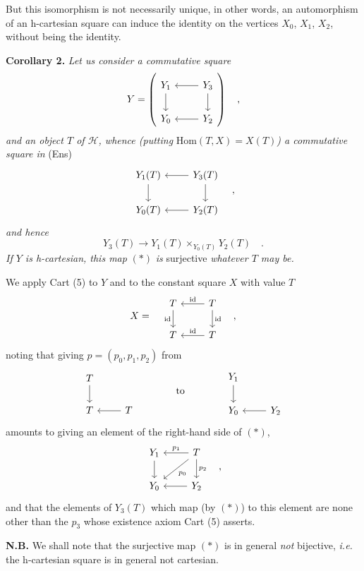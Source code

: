 But this isomorphism is not necessarily unique, in other words, an automorphism of an h-cartesian square can induce the identity on the vertices $X_0$, $X_1$, $X_2$, without being the identity.


\textbf{Corollary 2.} \textit{Let us consider a commutative square}
\[
Y = \left(\begin{tikzcd}
Y_1 \ar[d] & Y_3 \ar[l] \ar[d] \\
Y_0 & Y_2 \ar[l]
\end{tikzcd}\right) \quad ,
\]
\textit{and an object $T$ of $\mathcal{H}$, whence (putting} $\mathrm{Hom}(T,X) = X(T)$\textit{) a commutative square in} (Ens)
\[
\begin{tikzcd}
Y_1(T) \ar[d] & Y_3(T) \ar[l] \ar[d] \\
Y_0(T) & Y_2(T) \ar[l]
\end{tikzcd} \quad ,
\]
\textit{and hence}
\[
Y_3(T) \longrightarrow Y_1(T) \times_{Y_0(T)} Y_2(T) \quad . \tag*{$(*)$}
\]
\textit{If $Y$ is h-cartesian, this map} $(*)$ \textit{is} surjective \textit{whatever $T$ may be.}

We apply Cart (5) to $Y$ and to the constant square $X$ with value $T$
\[
X = \quad
\begin{tikzcd}
T \ar[d, "\mathrm{id}"'] & T \ar[l, "\mathrm{id}"'] \ar[d, "\mathrm{id}"] \\
T & T \ar[l, "\mathrm{id}"']
\end{tikzcd} \quad ,
\]
noting that giving $p = (p_0, p_1, p_2)$ from
\[
\begin{tikzcd}
T \ar[d] & \\
T & T \ar[l]
\end{tikzcd}
\qquad\qquad \text{to} \qquad\qquad
\begin{tikzcd}
Y_1 \ar[d] & \\
Y_0 & Y_2 \ar[l]
\end{tikzcd}
\]
amounts to giving an element of the right-hand side of $(*)$,
\[
\begin{tikzcd}
Y_1 \ar[d] & T \ar[l, "p_1"'] \ar[dl, "p_0"] \ar[d, "p_2"] \\
Y_0 & Y_2 \ar[l]
\end{tikzcd} \quad ,
\]
and that the elements of $Y_3(T)$ which map (by $(*)$) to this element are none other than the $p_3$ whose existence axiom Cart (5) asserts.

\textbf{N.B.} We shall note that the surjective map $(*)$ is in general \textit{not} bijective, \textit{i.e.} the h-cartesian square is in general not cartesian.

